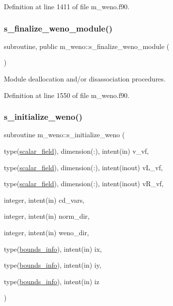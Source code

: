 Definition at line 1411 of file m\+\_\+weno.\+f90.

\mbox{\label{namespacem__weno_a2e2bca630c0e8e8afac63e905f23783c}} 
\subsubsection{\texorpdfstring{s\+\_\+finalize\+\_\+weno\+\_\+module()}{s\_finalize\_weno\_module()}}
{\footnotesize\ttfamily subroutine, public m\+\_\+weno\+::s\+\_\+finalize\+\_\+weno\+\_\+module (\begin{DoxyParamCaption}{ }\end{DoxyParamCaption})}



Module deallocation and/or disassociation procedures. 



Definition at line 1550 of file m\+\_\+weno.\+f90.

\mbox{\label{namespacem__weno_aa2c34f80dbff64204b9fcf65a1bc137a}} 
\subsubsection{\texorpdfstring{s\+\_\+initialize\+\_\+weno()}{s\_initialize\_weno()}}
{\footnotesize\ttfamily subroutine m\+\_\+weno\+::s\+\_\+initialize\+\_\+weno (\begin{DoxyParamCaption}\item[{type(\hyperlink{structm__derived__types_1_1scalar__field}{scalar\+\_\+field}), dimension(\+:), intent(in)}]{v\+\_\+vf,  }\item[{type(\hyperlink{structm__derived__types_1_1scalar__field}{scalar\+\_\+field}), dimension(\+:), intent(inout)}]{v\+L\+\_\+vf,  }\item[{type(\hyperlink{structm__derived__types_1_1scalar__field}{scalar\+\_\+field}), dimension(\+:), intent(inout)}]{v\+R\+\_\+vf,  }\item[{integer, intent(in)}]{cd\+\_\+vars,  }\item[{integer, intent(in)}]{norm\+\_\+dir,  }\item[{integer, intent(in)}]{weno\+\_\+dir,  }\item[{type(\hyperlink{structm__derived__types_1_1bounds__info}{bounds\+\_\+info}), intent(in)}]{ix,  }\item[{type(\hyperlink{structm__derived__types_1_1bounds__info}{bounds\+\_\+info}), intent(in)}]{iy,  }\item[{type(\hyperlink{structm__derived__types_1_1bounds__info}{bounds\+\_\+info}), intent(in)}]{iz }\end{DoxyParamCaption})}



